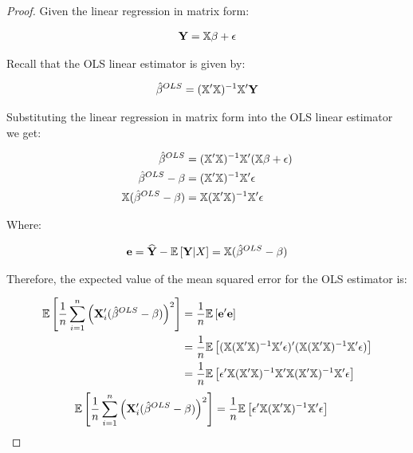 \begin{proof}

Given the linear regression in matrix form:

\begin{align*}
    \mathbf{Y} = \mathbb{X}\beta + \epsilon
\end{align*}

Recall that the OLS linear estimator is given by:

\begin{align*}
    \hat{\beta}^{OLS} = (\mathbb{X}'\mathbb{X})^{-1}\mathbb{X}'\mathbf{Y}
\end{align*}

Substituting the linear regression in matrix form into the OLS linear estimator we get:

\begin{align*}
    \hat{\beta}^{OLS} &= (\mathbb{X}'\mathbb{X})^{-1}\mathbb{X}'(\mathbb{X}\beta + \epsilon) \\
    \hat{\beta}^{OLS} - \beta &= (\mathbb{X}'\mathbb{X})^{-1}\mathbb{X}'\epsilon \\
    \mathbb{X}(\hat{\beta}^{OLS} - \beta) &= \mathbb{X}(\mathbb{X}'\mathbb{X})^{-1}\mathbb{X}'\epsilon \\
\end{align*}

Where: 

\begin{align*}
    \mathbf{e} = \widehat{\mathbf{Y}} - \mathbb{E}\left[\mathbf{Y} | X\right] = \mathbb{X}(\hat{\beta}^{OLS} - \beta) 
\end{align*}

Therefore, the expected value of the mean squared error for the OLS estimator is:

\begin{align*}
\mathbb{E}\left[
    \frac{1}{n}
    \sum_{i=1}^{n} \left(\mathbf{X}_i' 
        (\hat{\beta}^{OLS} - \beta)
    \right)^2
\right]
&=
\frac{1}{n} \mathbb{E}\left[
    \mathbf{e}'\mathbf{e}
\right]\\
&= \frac{1}{n} \mathbb{E}\left[
    (\mathbb{X}(\mathbb{X}'\mathbb{X})^{-1}\mathbb{X}'\epsilon)'(\mathbb{X}(\mathbb{X}'\mathbb{X})^{-1}\mathbb{X}'\epsilon)
\right]\\
&= \frac{1}{n} \mathbb{E}\left[
    \epsilon'\mathbb{X}(\mathbb{X}'\mathbb{X})^{-1}\mathbb{X}'\mathbb{X}(\mathbb{X}'\mathbb{X})^{-1}\mathbb{X}'\epsilon
\right]\\
\end{align*}
\begin{align}
\mathbb{E}\left[
    \frac{1}{n}
    \sum_{i=1}^{n} \left(\mathbf{X}_i' 
        (\hat{\beta}^{OLS} - \beta)
    \right)^2
\right]
&= \frac{1}{n} \mathbb{E}\left[
    \epsilon'\mathbb{X}(\mathbb{X}'\mathbb{X})^{-1}\mathbb{X}'\epsilon
\right]
\label{eq:expected-value-mse}
\end{align}


\end{proof}
